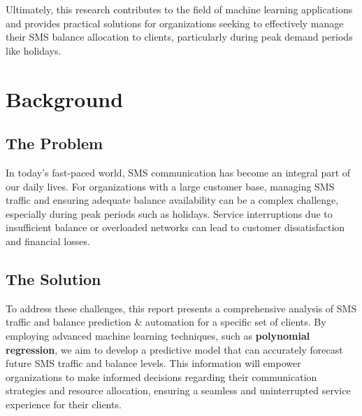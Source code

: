 \documentclass[12pt]{book} %
\begin{document}
Ultimately, this research contributes to the field of machine learning applications and provides practical solutions for organizations seeking to effectively manage their SMS balance allocation to clients, particularly during peak demand periods like holidays.






\section{Background}
\subsection{The Problem}

In today's fast-paced world, SMS communication has become an integral part of our daily lives. For organizations with a large customer base, managing SMS traffic and ensuring adequate balance availability can be a complex challenge, especially during peak periods such as holidays. Service interruptions due to insufficient balance or overloaded networks can lead to customer dissatisfaction and financial losses.

\subsection{The Solution}

To address these challenges, this report presents a comprehensive analysis of SMS traffic and balance prediction \& automation for a specific set of clients. By employing advanced machine learning techniques, such as \textbf{polynomial regression}, we aim to develop a predictive model that can accurately forecast future SMS traffic and balance levels. This information will empower organizations to make informed decisions regarding their communication strategies and resource allocation, ensuring a seamless and uninterrupted service experience for their clients.
\end{document}
